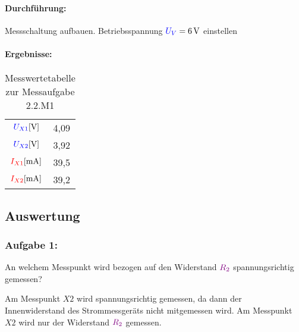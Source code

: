 \documentclass[11pt,a4paper,titlepage]{scrreprt}
\begin{document}
            \paragraph{Durchführung:} Messschaltung aufbauen. Betriebsspannung $\textcolor{blue}{U_V} = \SI{6}{\volt}$ einstellen
            \pagebreak
            \paragraph{Ergebnisse:}
                 \begin{center}
                    \begin{table}[!hbtp]
                        \caption{Messwertetabelle zur Messaufgabe 2.2.M1}
                        \label{tbl:messergebnisse2.1}
                        \renewcommand{\arraystretch}{1.3}
                        \begin{center}
                            \begin{tabular}{c|c}
                                $\textcolor{blue}{U_{X1}} [\si{\volt}]$ & 4,09\\
                                $\textcolor{blue}{U_{X2}} [\si{\volt}]$ & 3,92\\ \hline
                                $\textcolor{red}{I_{X1}} [\si{\milli\ampere}]$ & 39,5\\
                                $\textcolor{red}{I_{X2}} [\si{\milli\ampere}]$ & 39,2
                            \end{tabular}
                        \end{center}
                    \end{table}
                \end{center}
            
        \subsection{Auswertung}
            \subsubsection{Aufgabe 1:}  An welchem Messpunkt wird bezogen auf den Widerstand $\textcolor{violet}{R_2}$ spannungsrichtig gemessen?
            
            Am Messpunkt $X2$ wird spannungsrichtig gemessen, da dann der Innenwiderstand des Strommessgeräts nicht mitgemessen wird. Am Messpunkt $X2$ wird nur der Widerstand $\textcolor{violet}{R_2}$ gemessen.
            
            
\end{document}
